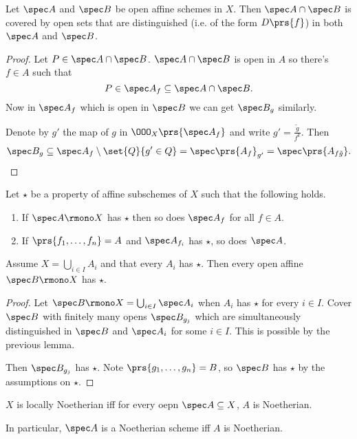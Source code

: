 \documentclass[10pt,a4paper,twoside,openany,hidelinks]{book}
\begin{document}
\begin{lemma}
Let $\spec A$ and $\spec B$ be open affine schemes in $X$. Then $\spec A \cap \spec B$ is covered by open sets that are distinguished (i.e. of the form $D\prs{f}$) in both $\spec A$ and $\spec B$.
\end{lemma}

\begin{proof}
Let $P \in \spec A \cap \spec B$. $\spec A \cap \spec B$ is open in $A$ so there's $f \in A$ such that $$P \in \spec A_f \subseteq \spec A \cap \spec B\text{.}$$
Now in $\spec A_f$ which is open in $\spec B$ we can get $\spec B_g$ similarly.

Denote by $g'$ the map of $g$ in $\OOO_X\prs{\spec A_f}$ and write $g' = \frac{\tilde{g}}{f^k}$.
Then $$\spec B_g \subseteq \spec A_f \setminus \set{Q}{g' \in Q} = \spec\prs{A_f}_{g'} = \spec \prs{A_{f \tilde{g}}} \text{.}$$
\end{proof}

\begin{lemma}
Let $\star$ be a property of affine subschemes of $X$ such that the following holds.
\begin{enumerate}
    \item If $\spec A \rmono X$ has $\star$ then so does $\spec A_f$ for all $f \in A$.
    \item If $\prs{f_1, \ldots, f_n} = A$ and $\spec A_{f_i}$ has $\star$, so does $\spec A$.
\end{enumerate}
Assume $X = \bigcup_{i \in I} A_i$ and that every $A_i$ has $\star$. Then every open affine $\spec B \rmono X$ has $\star$.
\end{lemma}

\begin{proof}
Let $\spec B \rmono X = \bigcup_{i \in I} \spec A_i$ when $A_i$ has $\star$ for every $i \in I$.
Cover $\spec B$ with finitely many opens $\spec B_{g_j}$ which are simultaneously distinguished in $\spec B$ and $\spec A_i$ for some $i \in I$. This is possible by the previous lemma.

Then $\spec B_{g_j}$ has $\star$. Note $\prs{g_1, \ldots, g_n} = B$, so $\spec B$ has $\star$ by the assumptions on $\star$.
\end{proof}

\begin{proposition}
$X$ is locally Noetherian iff for every oepn $\spec A \subseteq X$, $A$ is Noetherian.

In particular, $\spec A$ is a Noetherian scheme iff $A$ is Noetherian.
\end{proposition}
\end{document}
